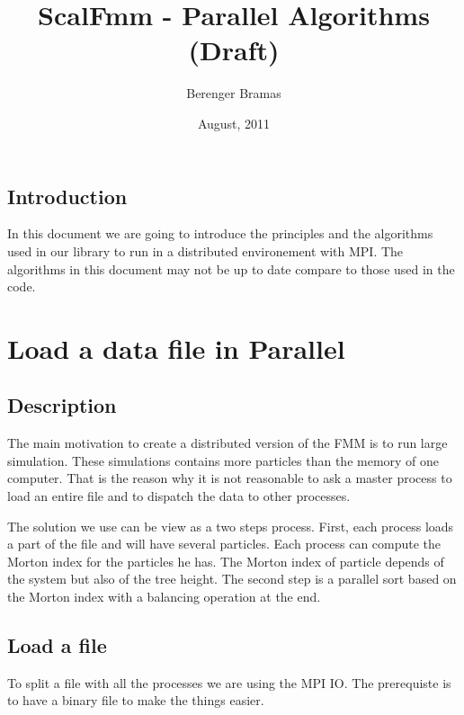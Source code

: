 \documentclass[10pt,letterpaper,titlepage]{report}
\author{Berenger Bramas}
\title{ScalFmm - Parallel Algorithms (Draft)}
\date{August, 2011}
\begin{document}
\maketitle{}
\newpage

\tableofcontents
\newpage


\section{Introduction}
In this document we are going to introduce the principles and the algorithms used in our library to run in a distributed environement with MPI.
The algorithms in this document may not be up to date compare to those used in the code.


\chapter{Load a data file in Parallel}
\section{Description}
The main motivation to create a distributed version of the FMM is to run large simulation.
These simulations contains more particles than the memory of one computer.
That is the reason why it is not reasonable to ask a master process to load an entire file and to dispatch the data to other processes.

The solution we use can be view as a two steps process.
First, each process loads a part of the file and will have several particles.
Each process can compute the Morton index for the particles he has.
The Morton index of particle depends of the system but also of the tree height.
The second step is a parallel sort based on the Morton index with a balancing operation at the end.


\section{Load a file}
To split a file with all the processes we are using the MPI IO.
The prerequiste is to have a binary file to make the things easier.
\end{document}
